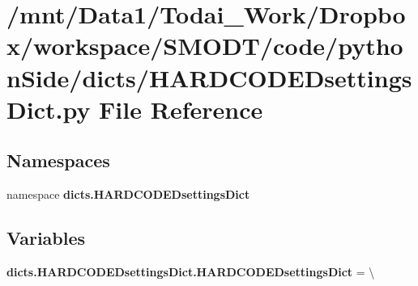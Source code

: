 \section{/mnt/\-Data1/\-Todai\-\_\-\-Work/\-Dropbox/workspace/\-S\-M\-O\-D\-T/code/python\-Side/dicts/\-H\-A\-R\-D\-C\-O\-D\-E\-Dsettings\-Dict.py File Reference}
\label{_h_a_r_d_c_o_d_e_dsettings_dict_8py}
\subsection*{Namespaces}
\begin{DoxyCompactItemize}
\item 
namespace {\bf dicts.\-H\-A\-R\-D\-C\-O\-D\-E\-Dsettings\-Dict}
\end{DoxyCompactItemize}
\subsection*{Variables}
\begin{DoxyCompactItemize}
\item 
{\bf dicts.\-H\-A\-R\-D\-C\-O\-D\-E\-Dsettings\-Dict.\-H\-A\-R\-D\-C\-O\-D\-E\-Dsettings\-Dict} = \textbackslash{}
\end{DoxyCompactItemize}
